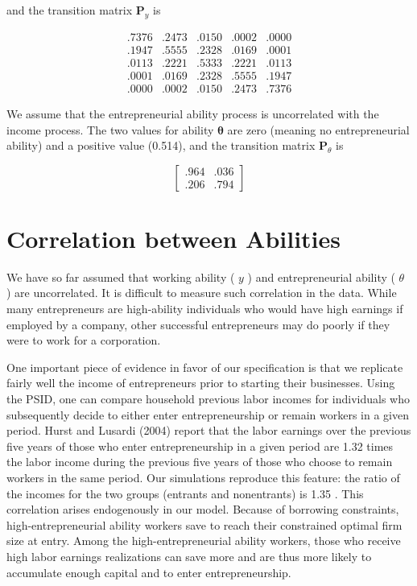 \documentclass[10pt]{article}
\begin{document}
and the transition matrix $\mathbf{P}_{y}$ is

$$
\begin{array}{lllll}
.7376 & .2473 & .0150 & .0002 & .0000 \\
.1947 & .5555 & .2328 & .0169 & .0001 \\
.0113 & .2221 & .5333 & .2221 & .0113 \\
.0001 & .0169 & .2328 & .5555 & .1947 \\
.0000 & .0002 & .0150 & .2473 & .7376
\end{array}
$$

We assume that the entrepreneurial ability process is uncorrelated with the income process. The two values for ability $\boldsymbol{\theta}$ are zero (meaning no entrepreneurial ability) and a positive value (0.514), and the transition matrix $\mathbf{P}_{\theta}$ is

$$
\left[\begin{array}{ll}
.964 & .036 \\
.206 & .794
\end{array}\right]
$$

\section*{Correlation between Abilities}
We have so far assumed that working ability ( $y$ ) and entrepreneurial ability ( $\theta$ ) are uncorrelated. It is difficult to measure such correlation in the data. While many entrepreneurs are high-ability individuals who would have high earnings if employed by a company, other successful entrepreneurs may do poorly if they were to work for a corporation.

One important piece of evidence in favor of our specification is that we replicate fairly well the income of entrepreneurs prior to starting their businesses. Using the PSID, one can compare household previous labor incomes for individuals who subsequently decide to either enter entrepreneurship or remain workers in a given period. Hurst and Lusardi (2004) report that the labor earnings over the previous five years of those who enter entrepreneurship in a given period are 1.32 times the labor income during the previous five years of those who choose to remain workers in the same period. Our simulations reproduce this feature: the ratio of the incomes for the two groups (entrants and nonentrants) is 1.35 . This correlation arises endogenously in our model. Because of borrowing constraints, high-entrepreneurial ability workers save to reach their constrained optimal firm size at entry. Among the high-entrepreneurial ability workers, those who receive high labor earnings realizations can save more and are thus more likely to accumulate enough capital and to enter entrepreneurship.
\end{document}

